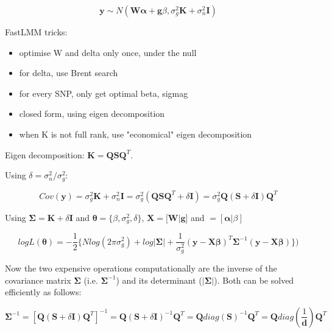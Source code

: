 \begin{equation}\label{eq34}
 \mathbf{y} \sim  N(\mathbf{W}\boldsymbol{\alpha} + \mathbf{g}\beta, \sigma_g^2\mathbf{K} + \sigma_n^2\mathbf{I})
\end{equation}

FastLMM tricks:
\begin{itemize}
    \item optimise W and delta only once, under the null
    \item for delta, use Brent search
    \item for every SNP, only get optimal beta, sigmag
    \item closed form, using eigen decomposition
    \item when K is not full rank, use "economical" eigen decomposition
\end{itemize}

Eigen decomposition: $\mathbf{K} = \mathbf{Q}\mathbf{S}\mathbf{Q}^T$.

Using $\delta = \sigma_n^2/\sigma_g^2$:

\begin{equation}\label{eq35}
 Cov(\mathbf{y}) = \sigma_g^2\mathbf{K} + \sigma_n^2\mathbf{I} = \sigma_g^2(\mathbf{Q}\mathbf{S}\mathbf{Q}^T + \delta\mathbf{I})= \sigma_g^2\mathbf{Q} (\mathbf{S} + \delta\mathbf{I})\mathbf{Q}^T
\end{equation}

Using $\boldsymbol{\Sigma} = \mathbf{K} + \delta\mathbf{I}$ and $\boldsymbol{\theta} = \{\beta, \sigma_g^2, \delta\}$, $\mathbf{X} = [\mathbf{W} | \mathbf{g}$] and $\boldsymbol = [\boldsymbol{\alpha} | \beta]$

\begin{equation} \label{eq36}
 logL(\boldsymbol{\theta}) = -\frac{1}{2} \bigg\{Nlog(2\pi\sigma_g^2) + log|\boldsymbol{\Sigma}|+ \frac{1}{\sigma_g^2}(\mathbf{y}-\mathbf{X}\boldsymbol{\beta})^T\boldsymbol{\Sigma}^{-1}(\mathbf{y}-\mathbf{X}\boldsymbol{\beta}) \bigg\}) 
\end{equation}

Now the two expensive operations computationally are the inverse of the covariance matrix $\boldsymbol{\Sigma}$ (i.e. $\boldsymbol{\Sigma}^{-1}$) and its determinant ($|\boldsymbol{\Sigma}|$). 
Both can be solved efficiently as follows:  

\begin{equation}
    \boldsymbol{\Sigma}^{-1} = [\mathbf{Q} (\mathbf{S} + \delta\mathbf{I})\mathbf{Q}^T]^{-1} = \mathbf{Q} (\mathbf{S} + \delta\mathbf{I})^{-1}\mathbf{Q}^T = \mathbf{Q} diag(\mathbf{S})^{-1}\mathbf{Q}^T = \mathbf{Q} diag(\frac{1}{\mathbf{d}})\mathbf{Q}^T
\end{equation}

